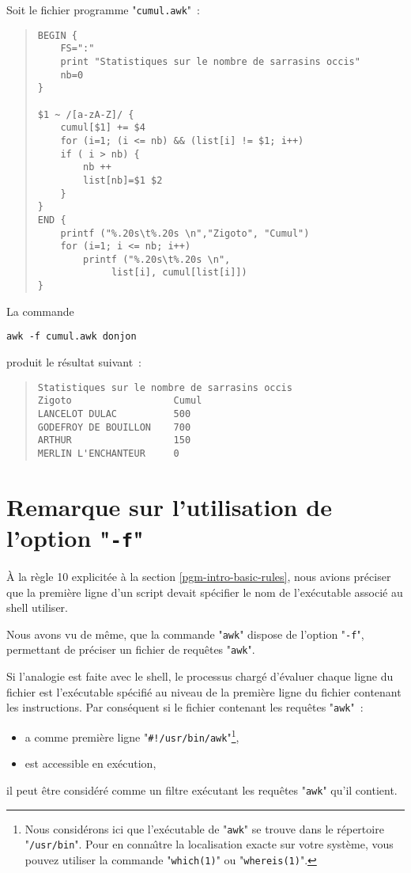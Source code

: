 Soit le fichier programme "\texttt{cumul.awk}"~:
\begin{quote}
\begin{verbatim}
BEGIN {
    FS=":"
    print "Statistiques sur le nombre de sarrasins occis"
    nb=0
}

$1 ~ /[a-zA-Z]/ {
    cumul[$1] += $4
    for (i=1; (i <= nb) && (list[i] != $1; i++)
    if ( i > nb) {
        nb ++
        list[nb]=$1 $2
    }
}
END {
    printf ("%.20s\t%.20s \n","Zigoto", "Cumul")
    for (i=1; i <= nb; i++)
        printf ("%.20s\t%.20s \n",
             list[i], cumul[list[i]])
}
\end{verbatim}
\end{quote}

La commande
\begin{center}
\begin{verbatim}
awk -f cumul.awk donjon
\end{verbatim}
\end{center}
produit le r{\'e}sultat suivant~:
\begin{quote}
\begin{verbatim}
Statistiques sur le nombre de sarrasins occis
Zigoto                  Cumul
LANCELOT DULAC          500
GODEFROY DE BOUILLON    700
ARTHUR                  150
MERLIN L'ENCHANTEUR     0
\end{verbatim}
\end{quote}

\section{\label{adv-fltrs-awk-f}Remarque sur l'utilisation de l'option "\texttt{-f}"}

{\`A} la r{\`e}gle 10 explicit{\'e}e {\`a} la section \ref{pgm-intro-basic-rules}, nous
avions pr{\'e}ciser que la premi{\`e}re ligne d'un script devait sp{\'e}cifier le nom
de l'ex{\'e}cutable associ{\'e} au shell utiliser.

Nous avons vu de m{\^e}me, que la commande "\texttt{awk}" dispose de l'option
"\texttt{-f}", permettant de pr{\'e}ciser un fichier de requ{\^e}tes "\texttt{awk}".

Si l'analogie est faite avec le shell, le processus charg{\'e} d'{\'e}valuer chaque
ligne du fichier est l'ex{\'e}cutable sp{\'e}cifi{\'e} au niveau de la premi{\`e}re
ligne du fichier contenant les instructions. Par cons{\'e}quent si le fichier
contenant les requ{\^e}tes "\texttt{awk}"~:
\begin{itemize}
	\item	a comme premi{\`e}re ligne "\verb=#!/usr/bin/awk="\footnote{Nous
			consid{\'e}rons ici que l'ex{\'e}cutable de "\texttt{awk}" se trouve dans
			le r{\'e}pertoire "\texttt{/usr/bin}". Pour en conna{\^\i}tre la
			localisation exacte sur votre syst{\`e}me, vous pouvez utiliser
			la commande "\texttt{which(1)}" ou "\texttt{whereis(1)}".},
	\item	est accessible en ex{\'e}cution,
\end{itemize}
il peut {\^e}tre consid{\'e}r{\'e} comme un filtre ex{\'e}cutant les requ{\^e}tes "\texttt{awk}"
qu'il contient.

